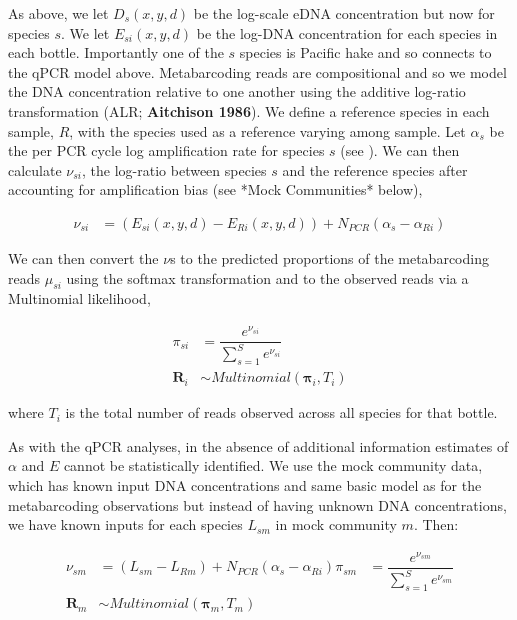 \documentclass{article}
\begin{document}
As above, we let $D_s(x,y,d)$ be the log-scale eDNA concentration but now for species $s$. We let $E_{si}(x,y,d)$ be the log-DNA concentration for each species in each bottle. Importantly one of the $s$ species is Pacific hake and so connects to the qPCR model above. Metabarcoding reads are compositional and so we model the DNA concentration relative to one another using the additive log-ratio transformation (ALR; \textbf{Aitchison 1986}).  We define a reference species in each sample, $R$, with the species used as a reference varying among sample. Let $\alpha_s$ be the per PCR cycle log amplification rate for species $s$ (see \cite{shelton2023}).  We can then calculate $\nu_{si}$, the log-ratio between species $s$ and the reference species after accounting for amplification bias (see *Mock Communities* below),

\begin{align} 
  \nu_{si} &= \left( E_{si}(x,y,d) - E_{Ri}(x,y,d)\right) + N_{PCR} \left(\alpha_s - \alpha_{Ri} \right) 
\end{align}

We can then convert the $\nu$s to the predicted proportions of the metabarcoding reads $\mu_{si}$ using the softmax transformation and to the observed reads via a Multinomial likelihood,

\begin{align} 
  \pi_{si} &= \dfrac{e^{\nu_{si}}}{\sum_{s=1}^S e^{\nu_{si}}} \\
  \boldsymbol{R}_{i} & \sim Multinomial\left(\boldsymbol{\pi}_{i},T_{i}\right) 
\end{align}

where $T_{i}$ is the total number of reads observed across all species for that bottle. 

As with the qPCR analyses, in the absence of additional information estimates of $\alpha$ and $E$ cannot be statistically identified.  We use the mock community data, which has known input DNA concentrations and  same basic model as for the metabarcoding observations but instead of having unknown DNA concentrations, we have known inputs for each species $L_{sm}$ in mock community $m$. Then:

\begin{align} 
 \nu_{sm} &= \left( L_{sm} - L_{Rm}\right) + N_{PCR} \left(\alpha_s - \alpha_{Ri} \right) 
  \pi_{sm} &= \dfrac{e^{\nu_{sm}}}{\sum_{s=1}^S e^{\nu_{sm}}} \\
  \boldsymbol{R}_{m} & \sim Multinomial\left(\boldsymbol{\pi}_{m},T_{m}\right) 
\end{align}
\end{document}
